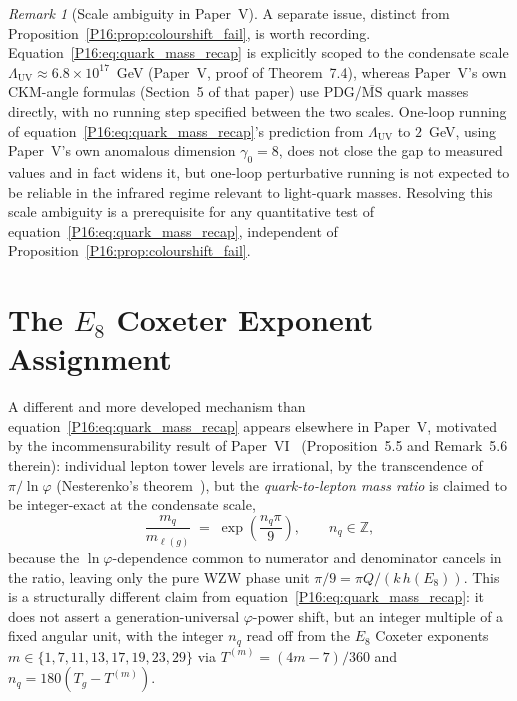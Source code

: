 \documentclass[11pt,a4paper]{article}
\theoremstyle{definition}\newtheorem{definition}[theorem]{Definition}
\theoremstyle{remark}
\newtheorem{remark}[theorem]{Remark}
\theoremstyle{definition}\newtheorem{construction}[theorem]{Construction}
\newcommand{\vp}{\varphi}
\newcommand{\LUV}{\Lambda_{\mathrm{UV}}}
\begin{document}
\begin{remark}[Scale ambiguity in Paper~V]
\label{P16:rem:scale_ambiguity}
A separate issue, distinct from Proposition~\ref{P16:prop:colourshift_fail},
is worth recording. Equation~\eqref{P16:eq:quark_mass_recap} is explicitly
scoped to the condensate scale $\LUV\approx6.8\times10^{17}$~GeV
(Paper~V, proof of Theorem~7.4), whereas Paper~V's own CKM-angle
formulas (Section~5 of that paper) use PDG/$\overline{\mathrm{MS}}$
quark masses directly, with no running step specified between the two
scales. One-loop running of equation~\eqref{P16:eq:quark_mass_recap}'s
prediction from $\LUV$ to $2$~GeV, using Paper~V's own anomalous
dimension $\gamma_0=8$, does not close the gap to measured values and
in fact widens it, but one-loop perturbative running is not expected
to be reliable in the infrared regime relevant to light-quark masses.
Resolving this scale ambiguity is a prerequisite for any quantitative
test of equation~\eqref{P16:eq:quark_mass_recap}, independent of
Proposition~\ref{P16:prop:colourshift_fail}.
\end{remark}

\section{The $E_8$ Coxeter Exponent Assignment}
\label{P16:sec:e8coxeter}

A different and more developed mechanism than
equation~\eqref{P16:eq:quark_mass_recap} appears elsewhere in Paper~V,
motivated by the incommensurability result of Paper~VI~\cite{Paper6}
(Proposition~5.5 and Remark~5.6 therein): individual lepton tower
levels are irrational, by the transcendence of $\pi/\ln\vp$
(Nesterenko's theorem~\cite{Nesterenko1996}), but the
\emph{quark-to-lepton mass ratio} is claimed to be integer-exact at
the condensate scale,
\begin{equation}
  \frac{m_q}{m_{\ell(g)}} \;=\; \exp\!\left(\frac{n_q\pi}{9}\right),
  \qquad n_q\in\mathbb{Z},
  \label{P16:eq:e8_ratio_recap}
\end{equation}
because the $\ln\vp$-dependence common to numerator and denominator
cancels in the ratio, leaving only the pure WZW phase unit
$\pi/9=\pi Q/(k\,h(E_8))$. This is a structurally different claim from
equation~\eqref{P16:eq:quark_mass_recap}: it does not assert a
generation-universal $\vp$-power shift, but an integer multiple of a
fixed angular unit, with the integer $n_q$ read off from the $E_8$
Coxeter exponents $m\in\{1,7,11,13,17,19,23,29\}$ via
$T^{(m)}=(4m-7)/360$ and $n_q=180(T_g-T^{(m)})$.
\end{document}
